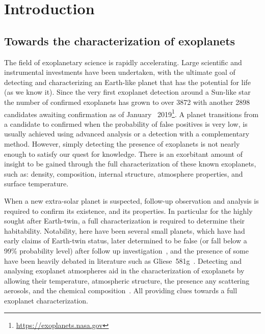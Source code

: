 
\chapter{Introduction}\label{cha:introduction}

\section{Towards the characterization of exoplanets}

The field of exoplanetary science is rapidly accelerating.
Large scientific and instrumental investments have been undertaken, with the ultimate goal of detecting and characterizing an Earth-like planet that has the potential for life (as we know it).
Since the very first exoplanet detection around a Sun-like star~\citep{mayor_jupitermass_1995} the number of confirmed exoplanets has grown to over 3872 with another 2898 candidates awaiting confirmation as of January~ 2019\footnote{\href{https://exoplanets.nasa.gov/}{https://exoplanets.nasa.gov}}.
A planet transitions from a candidate to confirmed when the probability of false positives is very low, is usually achieved using advanced analysis or a detection with a complementary method.
However, simply detecting the presence of exoplanets is not nearly enough to satisfy our quest for knowledge.
There is an exorbitant amount of insight to be gained through the full characterization of these known exoplanets, such as: density, composition, internal structure, atmosphere properties, and surface temperature.

When a new extra-solar planet is suspected, follow-up observation and analysis is required to confirm its existence, and its properties.
In particular for the highly sought after Earth-twin, a full characterization is required to determine their habitability.
Notability, here have been several small planets, which have had early claims of Earth-twin status, later determined to be false (or fall below a 99\% probability level) after follow up investigation~\citep[e.g.][]{mullally_kepler_2018,burke_reevaluating_2019}, and the presence of some have been heavily debated in literature such as {Gliese~581g}~\citep{vogt_lickcarnegie_2010, gregory_bayesian_2011,robertson_stellar_2014}.
Detecting and analysing exoplanet atmospheres aid in the characterization of exoplanets by allowing their temperature, atmospheric structure, the presence any scattering aerosols, and the chemical composition~\citep[e.g.][]{}.
All providing clues towards a full exoplanet characterization.

